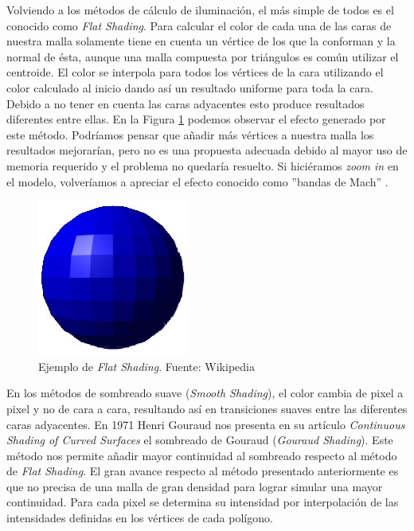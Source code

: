 \documentclass[titlepage,12pt]{article}
\begin{document}
Volviendo a los métodos de cálculo de iluminación, el más simple de todos es el conocido como \textit{Flat Shading}. Para calcular el color de cada una de las caras de nuestra malla solamente tiene en cuenta un vértice de los que la conforman y la normal de ésta, aunque una malla compuesta por triángulos es común utilizar el centroide. El color se interpola para todos los vértices de la cara utilizando el color calculado al inicio dando así un resultado uniforme para toda la cara. Debido a no tener en cuenta las caras adyacentes esto produce resultados diferentes entre ellas. En la Figura \ref{flat:shading} podemos observar el efecto generado por este método. Podríamos pensar que añadir más vértices a nuestra malla los resultados mejorarían, pero no es una propuesta adecuada debido al mayor uso de memoria requerido y el problema no quedaría resuelto. Si hiciéramos \textit{zoom in} en el modelo, volveríamos a apreciar el efecto conocido como ''bandas de Mach'' \citep{Lotto1999}.

\begin{figure}[ht]
	\centering
	\includegraphics[scale=0.5]{media/Flat-shading-sample.png}
	\caption{Ejemplo de \textit{Flat Shading}. Fuente: Wikipedia}
	\label{flat:shading}
\end{figure}

En los métodos de sombreado suave (\textit{Smooth Shading}), el color cambia de pixel a pixel y no de cara a cara, resultando así en transiciones suaves entre las diferentes caras adyacentes.
En 1971 Henri Gouraud nos presenta en su artículo \textit{Continuous Shading of Curved Surfaces} \citep{Henri1971} el sombreado de Gouraud (\textit{Gouraud Shading}). Este método nos permite añadir mayor continuidad al sombreado respecto al método de \textit{Flat Shading}. El gran avance respecto al método presentado anteriormente es que no precisa de una malla de gran densidad para lograr simular una mayor continuidad. Para cada pixel se determina su intensidad por interpolación de las intensidades definidas en los vértices de cada polígono.
\end{document}

